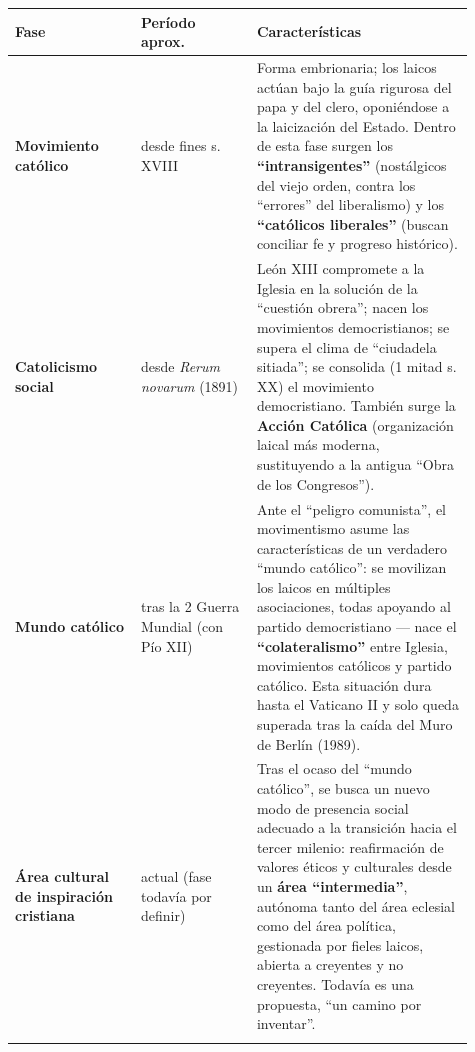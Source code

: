 \documentclass[10pt,a4paper]{article}
\begin{document}
{\small\renewcommand{\arraystretch}{1.25}
\begin{longtable}{>{\raggedright\arraybackslash}p{0.250\linewidth}>{\raggedright\arraybackslash}p{0.231\linewidth}>{\raggedright\arraybackslash}p{0.430\linewidth}}
\toprule
\textbf{Fase} & \textbf{Período aprox.} & \textbf{Características} \\ \midrule \endhead
\textbf{Movimiento católico} & desde fines s. XVIII & Forma embrionaria; los laicos actúan bajo la guía rigurosa del papa y del clero, oponiéndose a la laicización del Estado. Dentro de esta fase surgen los \textbf{``intransigentes''} (nostálgicos del viejo orden, contra los ``errores'' del liberalismo) y los \textbf{``católicos liberales''} (buscan conciliar fe y progreso histórico). \\ \addlinespace[2pt]
\textbf{Catolicismo social} & desde \textit{Rerum novarum} (1891) & León XIII compromete a la Iglesia en la solución de la ``cuestión obrera''; nacen los movimientos democristianos; se supera el clima de ``ciudadela sitiada''; se consolida (1\textordfeminine{} mitad s. XX) el movimiento democristiano. También surge la \textbf{Acción Católica} (organización laical más moderna, sustituyendo a la antigua ``Obra de los Congresos''). \\ \addlinespace[2pt]
\textbf{Mundo católico} & tras la 2\textordfeminine{} Guerra Mundial (con Pío XII) & Ante el ``peligro comunista'', el movimentismo asume las características de un verdadero ``mundo católico'': se movilizan los laicos en múltiples asociaciones, todas apoyando al partido democristiano --- nace el \textbf{``colateralismo''} entre Iglesia, movimientos católicos y partido católico. Esta situación dura hasta el Vaticano II y solo queda superada tras la caída del Muro de Berlín (1989). \\ \addlinespace[2pt]
\textbf{Área cultural de inspiración cristiana} & actual (fase todavía por definir) & Tras el ocaso del ``mundo católico'', se busca un nuevo modo de presencia social adecuado a la transición hacia el tercer milenio: reafirmación de valores éticos y culturales desde un \textbf{área ``intermedia''}, autónoma tanto del área eclesial como del área política, gestionada por fieles laicos, abierta a creyentes y no creyentes. Todavía es una propuesta, ``un camino por inventar''. \\ \addlinespace[2pt]
\bottomrule\end{longtable}}
\end{document}
